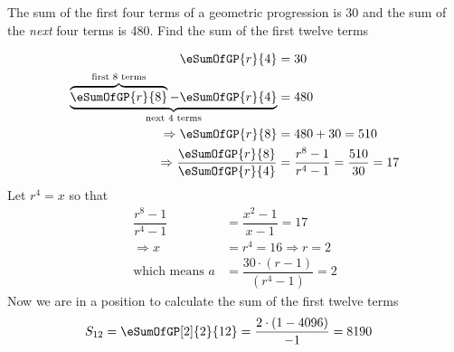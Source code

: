 
%
%
%
%
% 
% 

\question[4] The sum of the first four terms of a geometric progression is 30 and the 
sum of the \textit{next} four terms is 480. Find the sum of the first twelve terms



\ifprintanswers
\fi 

\begin{solution}[\fullpage]
	\begin{align}
		\eSumOfGP{r}{4} &= 30 \\
		\underbrace{\overbrace{\eSumOfGP{r}{8}}^{\text{first 8 terms}} 
		- \eSumOfGP{r}{4}}_{\text{next 4 terms}} &= 480 \\
		\Rightarrow \eSumOfGP{r}{8} &= 480 + 30 = 510 \\
		\Rightarrow \dfrac{\eSumOfGP{r}{8}}{\eSumOfGP{r}{4}} &= 
		\dfrac{r^8-1}{r^4-1} = \dfrac{510}{30} = 17
	\end{align}
	Let $r^4 =x$ so that
	\begin{align}
		\dfrac{r^8-1}{r^4-1} &= \dfrac{x^2-1}{x-1} = 17 \\
		\Rightarrow x &= r^4 = 16 \Rightarrow r = 2 \\
		\text{which means } a &= \dfrac{30\cdot(r-1)}{(r^4-1)} = 2
	\end{align}
	Now we are in a position to calculate the sum of the first twelve terms
	\begin{align}
		S_{12} &= \eSumOfGP[2]{2}{12} = \dfrac{2\cdot(1-4096)}{-1} = 8190
	\end{align}
\end{solution}
